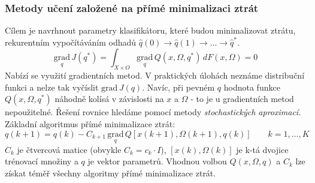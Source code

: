 \subsubsection*{Metody učení založené na přímé minimalizaci ztrát}
Cílem je navrhnout parametry klasifikátoru, které budou minimalizovat ztrátu, rekurentním vypočítáváním odhadů $ \hat{q}(0) \to \hat{q}(1) \to \dots \to \hat{q}^* $. 
\begin{equation}
\underset{q}{\mathrm{grad}} \, J(q^*) = \displaystyle{\int_{X \times O}} \underset{q}{\mathrm{grad}} \, Q(x, \Omega, q^*) \, dF(x, \Omega) = 0
\end{equation}
Nabízí se využití gradientních metod. V praktických úlohách neznáme distribuční funkci a nelze tak vyčíslit $ \mathrm{grad} \, J(q) $. Navíc, při pevném $ q $ hodnota funkce $ Q(x, \Omega, q^*) $ náhodně kolísá v závislosti na $ x $ a $ \Omega $ - to je u gradientních metod nepoužitelné. Řešení rovnice hledáme pomocí metody \textit{stochastických aproximací}. Základní algoritmus přímé minimalizace ztrát:
\begin{equation}
q(k+1) = q(k) - C_{k+1} \, \underset{q}{\mathrm{grad}} \, Q[x(k+1), \Omega(k+1), q(k)] \qquad k=1,...,K
\end{equation}
$ C_k $ je čtvercová matice (obvykle $ C_k = c_k \cdot I $), $ [x(k), \Omega(k)] $ je k-tá dvojice trénovací množiny a $ q $ je vektor parametrů. Vhodnou volbou $ Q(x, \Omega, q) $ a $ C_k $ lze získat téměř všechny algoritmy přímé minimalizace ztrát.

